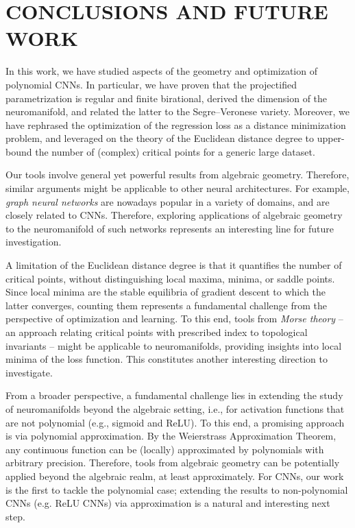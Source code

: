 \documentclass[twoside]{article}
\theoremstyle{plain}%
\theoremstyle{definition}
\theoremstyle{remark}
\begin{document}
\section{CONCLUSIONS AND FUTURE WORK}
In this work, we have studied aspects of the geometry and optimization of polynomial CNNs. In particular, we have proven that the projectified parametrization is regular and finite birational, derived the dimension of the neuromanifold, and related the latter to the Segre--Veronese variety. Moreover, we have rephrased the optimization of the regression loss as a distance minimization problem, and leveraged on the theory of the Euclidean distance degree to upper-bound the number of (complex) critical points for a generic large dataset. 

Our tools involve general yet powerful results from algebraic geometry. Therefore, similar arguments might be applicable to other neural architectures. For example, \emph{graph neural networks} \parencite{kipf2016semi, bronstein2021geometric} are nowadays popular in a variety of domains, and are closely related to CNNs. Therefore, exploring applications of algebraic geometry to the neuromanifold of such networks represents an interesting line for future investigation. 

A limitation of the Euclidean distance degree is that it quantifies the number of critical points, without distinguishing local maxima, minima, or saddle points. Since local minima are the stable equilibria of gradient descent to which the latter converges, counting them represents a fundamental challenge from the perspective of optimization and learning. To this end, tools from \emph{Morse theory} \parencite{milnor1963morse} -- an approach relating critical points with prescribed index to topological invariants -- might be applicable to neuromanifolds, providing insights into local minima of the loss function. This constitutes another interesting direction to investigate. 


From a broader perspective, a fundamental challenge lies in extending the study of neuromanifolds beyond the algebraic setting, i.e., for activation functions that are not polynomial (e.g., sigmoid and ReLU). To this end, a promising approach is via polynomial approximation. By the Weierstrass Approximation Theorem, any continuous function can be (locally) approximated by polynomials with arbitrary precision. Therefore, tools from algebraic geometry can be potentially applied beyond the algebraic realm, at least approximately. For CNNs, our work is the first to tackle the polynomial case; extending the results to non-polynomial CNNs (e.g. ReLU CNNs) via approximation is a natural and interesting next step. 
\end{document}
